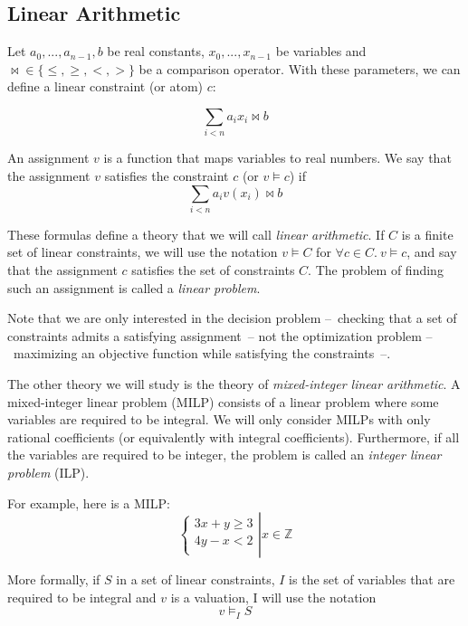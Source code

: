 \documentclass{article}
\newcommand{\ints}{\mathbb{Z}}
\begin{document}
\subsection{Linear Arithmetic}

Let $a_0, ..., a_{n-1}, b$ be real constants, $x_0, ..., x_{n-1}$ be
variables and ${\bowtie} \in \{\leqslant,\geqslant,<,>\}$ be a comparison
operator. With these parameters, we can define a linear constraint (or atom)
$c$:

$$\sum_{i < n} a_i x_i \bowtie b$$

An assignment $v$ is a function that maps variables to real numbers.
We say that the assignment $v$ satisfies the constraint $c$ (or $v \vDash c$)
if $$\sum_{i < n} a_i v(x_i) \bowtie b$$

These formulas define a theory that we will call \textit{linear arithmetic}.
If $C$ is a finite set of linear constraints,
we will use the notation $v \vDash C$ for $\forall c \in C.~v \vDash c$, and
say that the assignment $c$ satisfies the set of constraints $C$. The
problem of finding such an assignment is called a
\textit{linear problem}.

Note that we are only interested in the decision problem --~checking
that a set of constraints admits a satisfying assignment~-- not the
optimization problem --~maximizing an objective function while
satisfying the constraints~--.

The other theory we will study is the theory of \textit{mixed-integer linear
arithmetic}. A mixed-integer linear problem (MILP) consists of a linear
problem where some variables are required to be integral. We will only consider
MILPs with only rational coefficients (or equivalently with integral
coefficients). Furthermore, if all the variables are required to be
integer, the problem is called an \textit{integer linear problem} (ILP).

For example, here is a MILP:
\begin{displaymath}
  \left\{
  \begin{array}{l}
    3x + y \geqslant 3 \\
    4y - x < 2 \\
  \end{array}
  \right|
  x \in \ints
\end{displaymath}

More formally, if $S$ in a set of linear constraints, $I$ is the set of
variables that are required to be integral and $v$ is a valuation, I will use
the notation $$v \vDash_I S$$
\end{document}
